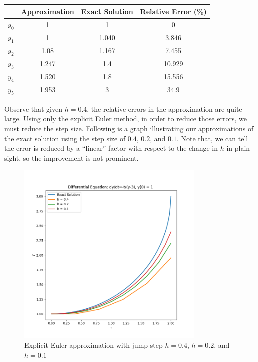 \documentclass[a4paper]{article}
\numberwithin{equation}{section}
\begin{document}
\begin{table}[H]
  \centering
  \begin{tabular}{@{}lSSS@{}}
    \toprule
    {}      & {Approximation} & {Exact Solution} & {Relative Error (\%)} \\
    \midrule
    \(y_0\) & 1               & 1                & 0                     \\
    \(y_1\) & 1               & 1.040            & 3.846                 \\
    \(y_2\) & 1.08            & 1.167            & 7.455                 \\
    \(y_3\) & 1.247           & 1.4              & 10.929                \\
    \(y_4\) & 1.520           & 1.8              & 15.556                \\
    \(y_5\) & 1.953           & 3                & 34.9                  \\
    \bottomrule
  \end{tabular}
\end{table}

Observe that given \(h = 0.4\), the relative errors in the approximation are quite large. Using only the explicit Euler method, in order to reduce those errors, we must reduce the step size. Following is a graph illustrating our approximations of the exact solution using the step size of \(0.4\), \(0.2\), and \(0.1\). Note that, we can tell the error is reduced by a ``linear'' factor with respect to the change in \(h\) in plain sight, so the improvement is not prominent.

\begin{figure}[H]
  \centering
  \includegraphics[width=0.8\textwidth]{plot_euler.png}
  \caption{Explicit Euler approximation with jump step \(h = 0.4\), \(h = 0.2\), and \(h = 0.1\)}
\end{figure}
\end{document}
